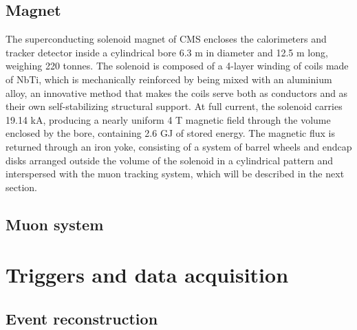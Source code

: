 \subsection{Magnet\label{sec:cms-magnet}}

The superconducting solenoid magnet of CMS encloses the calorimeters and tracker detector inside a cylindrical bore 6.3 m in diameter and 12.5 m long, weighing 220 tonnes. The solenoid is composed of a 4-layer winding of coils made of NbTi, which is mechanically reinforced by being mixed with an aluminium alloy, an innovative method that makes the coils serve both as conductors and as their own self-stabilizing structural support. At full current, the solenoid carries 19.14 kA, producing a nearly uniform 4 T magnetic field through the volume enclosed by the bore, containing 2.6 GJ of stored energy. The magnetic flux is returned through an iron yoke, consisting of a system of barrel wheels and endcap disks arranged outside the volume of the solenoid in a cylindrical pattern and interspersed with the muon tracking system, which will be described in the next section.

\subsection{Muon system\label{sec:cms-muon}}

\section{Triggers and data acquisition\label{sec:cms-triggerdaq}}

\subsection{Event reconstruction\label{sec:cms-reco}}
